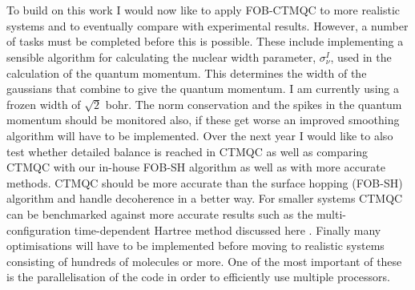 \\\\
To build on this work I would now like to apply FOB-CTMQC to more realistic systems and to eventually compare with experimental results. However, a number of tasks must be completed before this is possible. These include implementing a sensible algorithm for calculating the nuclear width parameter, $\sigma_{\nu}^{I}$, used in the calculation of the quantum momentum. This determines the width of the gaussians that combine to give the quantum momentum. I am currently using a frozen width of $\sqrt{2}$ bohr. The norm conservation and the spikes in the quantum momentum should be monitored also, if these get worse an improved smoothing algorithm will have to be implemented. Over the next year I would like to also test whether detailed balance is reached in CTMQC as well as comparing CTMQC with our in-house FOB-SH algorithm as well as with more accurate methods. CTMQC should be more accurate than the surface hopping (FOB-SH) algorithm and handle decoherence in a better way. For smaller systems CTMQC can be benchmarked against more accurate results such as the multi-configuration time-dependent Hartree method discussed here \cite{cattarius_all_2001}. Finally many optimisations will have to be implemented before moving to realistic systems consisting of hundreds of molecules or more. One of the most important of these is the parallelisation of the code in order to efficiently use multiple processors.